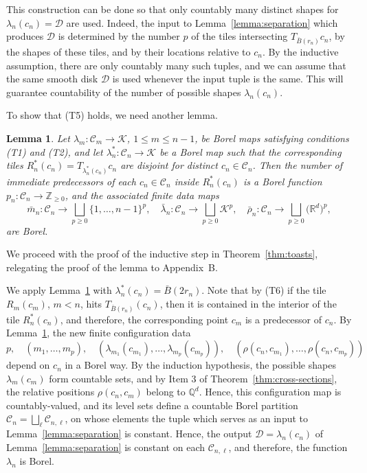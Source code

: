 \documentclass[11pt]{paper}
\newtheorem{lemma}{Lemma}
\newcommand{\bR}{\mathbb R}
\newcommand{\bZ}{\mathbb Z}
\newcommand{\bQ}{\mathbb Q}
\newcommand{\cC}{\mathcal C}
\newcommand{\cK}{\mathcal K}
\newcommand{\la}{\lambda}
\begin{document}
This construction can be done so that only countably many distinct shapes for
$\la_n(c_n)= \mathscr D$ are used. Indeed, the input to Lemma~\ref{lemma:separation} which produces $\mathscr D$ is determined by the number $p$ of the tiles
intersecting $T_{\bar B(r_n)} c_n $, by the shapes of these tiles,
and by their locations relative to $c_n$.
By the inductive assumption, there are only countably many such tuples, and we can assume that
the same smooth disk $\mathscr D$ is used whenever the input tuple is the same. This will guarantee
countability of the number of possible shapes $\la_n(c_n)$.

To show that (T5) holds, we need another lemma.
\begin{lemma}\label{lemma:p_n} \mbox{}
Let $\la_m\colon\cC_m\to\cK$, $1\le m \le n-1$, be Borel maps satisfying conditions (T1) and  (T2),
and let $\la_n^*\colon\cC_n\to\cK$ be a Borel map such that the corresponding tiles $R_n^*(c_n)=T_{\la_n^*(c_n)}c_n$ are disjoint for distinct
$c_n\in\cC_n$. Then the number of immediate predecessors of each $c_n\in\cC_n$
inside $R_n^*(c_n)$  is a Borel function $p_n\colon \cC_n \to \bZ_{\ge 0}$, and
the associated finite data maps
\[
\bar m_n\colon \cC_n\to \bigsqcup_{p\ge 0} \{1, \ldots , n-1\}^p,
\quad \bar\lambda_n\colon \cC_n\to \bigsqcup_{p\ge 0}\cK^{p},
\quad \bar\rho_n\colon \cC_n\to \bigsqcup_{p\ge 0}\bigl( \bR^d \bigr)^{p},
\]
are Borel.
\end{lemma}
We proceed with the proof of
the inductive step in Theorem~\ref{thm:toasts}, relegating the
proof of the lemma to Appendix~B.



We apply Lemma~\ref{lemma:p_n} with $\la_n^*(c_n)=\bar B(2r_n)$. Note that by (T6)
if the tile $R_m(c_m)$, $m<n$, hits $T_{\bar B(r_n)}(c_n)$, then it is contained in the interior
of the tile $R_n^*(c_n)$, and therefore, the corresponding point $c_m$ is a predecessor of $c_n$.
By Lemma~\ref{lemma:p_n}, the new finite configuration data
\[
p, \quad (m_1, \ldots , m_p), \quad
(\lambda_{m_1}(c_{m_1}), \ldots , \lambda_{m_p}(c_{m_p})), \quad
(\rho (c_n, c_{m_1}), \ldots ,  \rho(c_n, c_{m_p}))
\]
depend on $c_n$ in a Borel way. By the induction hypothesis, the possible shapes $\lambda_m(c_m)$
form countable sets, and by Item 3 of Theorem~\ref{thm:cross-sections}, the relative positions
$\rho(c_n, c_m)$ belong to $\bQ^d$. Hence, this configuration map is countably-valued, and its level
sets define a countable Borel partition $\cC_n = \bigsqcup_\ell \cC_{n, \ell}$,
on whose elements the tuple which serves as an input to Lemma~\ref{lemma:separation} is constant. Hence, the output $\mathscr D = \la_n(c_n)$ of Lemma~\ref{lemma:separation}
is constant on each $\cC_{n, \ell}$, and therefore, the function $\la_n$ is Borel.
\end{document}
